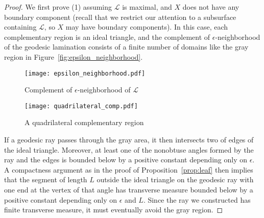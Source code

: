 \documentclass[11pt]{article} %
\theoremstyle{plain}
\theoremstyle{definition}
\numberwithin{equation}{section}
\begin{document}
\begin{proof}
We first prove (1) assuming $\mathcal{L}$ is maximal, and $X$ does not have any boundary component (recall that we restrict our attention to a subsurface containing $\mathcal{L}$, so $X$ may have boundary components). In this case, each complementary region is an ideal triangle, and the complement of $\epsilon$-neighborhood of the geodesic lamination consists of a finite number of domains like the gray region in Figure~\ref{fig:epsilon_neighborhood}.
\begin{figure}[ht!]
\centering
\begin{minipage}[b]{0.48\textwidth}
    \centering
    \texttt{[image: epsilon\_neighborhood.pdf]}
    \iffalse
    \begin{tikzpicture}
    \begin{scope}
    \clip (-1,0)--(1,0)--(1,5)--(-1,5)--cycle;
    \fill[gray, opacity=0.3] (-1,0)--(1,0)--(1,5)--(-1,5)--cycle;
    \fill[white] (-1,0)--(0,5)--(-2,5.1)--(-2,0)--cycle;
    \fill[white] (1,0)--(0,5)--(2,5.1)--(2,0)--cycle;
    \fill[white] (0,0.2) circle (1.01980390272);
    \end{scope}
    \draw (-3,0)--(3,0);
    \draw (-1,0)--(-1,5);
    \draw (1,0)--(1,5);
    \draw (1,0) arc (0:180:1);
    \end{tikzpicture}
    \fi
    \caption{Complement of $\epsilon$-neighborhood of $\mathcal{L}$}
    \label{fig:epsilon_neighborhood}
\end{minipage}
\begin{minipage}[b]{0.48\textwidth}
    \centering
    \texttt{[image: quadrilateral\_comp.pdf]}
    \iffalse
    \begin{tikzpicture}
    \begin{scope}
    \clip (-1,0)--(3.5,0)--(3.5,5)--(-1,5)--cycle;
    \draw[red] (4,0) circle (1.25);
    \fill[white] (0,0) circle (1);
    \fill[white] (2.25,0) circle (1.25);
    \end{scope}
    \draw (-2,0)--(4,0);
    \draw (-1,0)--(-1,5);
    \draw[dashed] (1,0)--(1,5);
    \draw (1,0) arc (0:180:1);
    \draw (1,0) arc (180:0:1.25);
    \draw[dashed] (-1,0) arc (180:0:2.25);
    \draw (3.5,0)--(3.5,5);
    \end{tikzpicture}
    \fi
    \caption{A quadrilateral complementary region}
    \label{fig:quadrilateral}
\end{minipage}
\end{figure}

If a geodesic ray passes through the gray area, it then intersects two of edges of the ideal triangle. Moreover, at least one of the nonobtuse angles formed by the ray and the edges is bounded below by a positive constant depending only on $\epsilon$. A compactness argument as in the proof of Proposition~\ref{prop:leaf} then implies that the segment of length $L$ outside the ideal triangle on the geodesic ray with one end at the vertex of that angle has transverse measure bounded below by a positive constant depending only on $\epsilon$ and $L$. Since the ray we constructed has finite transverse measure, it must eventually avoid the gray region.


\end{proof}
\end{document}
